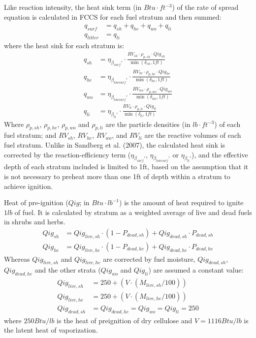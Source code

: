 \documentclass[]{book}
\begin{document}
Like reaction intensity, the heat sink term (in \(Btu \cdot ft^{-3}\)) of the rate of spread equation is calculated in FCCS for each fuel stratum and then summed:
\begin{eqnarray}
q_{surf} &= q_{sh}+q_{he}+q_{wo}+q_{li}\\
q_{litter} &= q_{li}
\label{eq:heatsink}
\end{eqnarray}
where the heat sink for each stratum is:
\begin{eqnarray}
q_{sh} &= \eta_{\beta_{surf}'}\cdot \frac{RV_{sh}\cdot \rho_{p,sh}\cdot Qig_{sh}}{\min(\delta_{sh}, 1ft)}\\
q_{he} &= \eta_{\beta_{lowsurf}'}\cdot \frac{RV_{he}\cdot \rho_{p,he}\cdot Qig_{he}}{\min(\delta_{he}, 1ft)}\\
q_{wo} &= \eta_{\beta_{lowsurf}'}\cdot \frac{RV_{wo}\cdot \rho_{p,wo}\cdot Qig_{wo}}{\min(\delta_{wo}, 1ft)}\\
q_{li} &= \eta_{\beta_{li}'}\cdot \frac{RV_{li}\cdot \rho_{p,li}\cdot Qig_{li}}{\min(\delta_{li}, 1ft)}
\label{eq:heatsinkstrat}
\end{eqnarray}
Where \(\rho_{p,sh}\), \(\rho_{p,he}\), \(\rho_{p,wo}\) and \(\rho_{p,li}\) are the particle densities (in \(lb\cdot ft^{-3}\)) of each fuel stratum; and \(RV_{sh}\), \(RV_{he}\), \(RV_{wo}\), and \(RV_{li}\) are the reactive volumes of each fuel stratum. Unlike in Sandberg et al. (2007), the calculated heat sink is corrected by the reaction-efficiency term (\(\eta_{\beta_{surf}'}\), \(\eta_{\beta_{lowsurf}'}\) or \(\eta_{\beta_{li}'}\)), and the effective depth of each stratum included is limited to 1ft, based on the assumption that it is not necessary to preheat more than one 1ft of depth within a stratum to achieve ignition.

Heat of pre-ignition (\(Qig\); in \(Btu \cdot lb^{-1}\)) is the amount of heat required to ignite \(1 lb\) of fuel. It is calculated by stratum as a weighted average of live and dead fuels in shrubs and herbs.
\begin{eqnarray}
Qig_{sh} &= Qig_{live, sh} \cdot (1 - P_{dead, sh})+ Qig_{dead, sh} \cdot P_{dead, sh}\\
Qig_{he} &= Qig_{live, he} \cdot (1 - P_{dead, he})+ Qig_{dead, he} \cdot P_{dead, he}
\end{eqnarray}
Whereas \(Qig_{live, sh}\) and \(Qig_{live, he}\) are corrected by fuel moisture, \(Qig_{dead, sh}\), \(Qig_{dead, he}\) and the other strata (\(Qig_{wo}\) and \(Qig_{li}\)) are assumed a constant value:
\begin{eqnarray}
Qig_{live, sh} &= 250 + (V\cdot (M_{live, sh}/100))\\
Qig_{live, he} &= 250 + (V\cdot (M_{live, he}/100))\\
Qig_{dead, sh} &= Qig_{dead, he} = Qig_{wo} = Qig_{li} = 250
\end{eqnarray}
where \(250 Btu/lb\) is the heat of preignition of dry cellulose and \(V = 1116 Btu/lb\) is the latent heat of vaporization.
\end{document}
